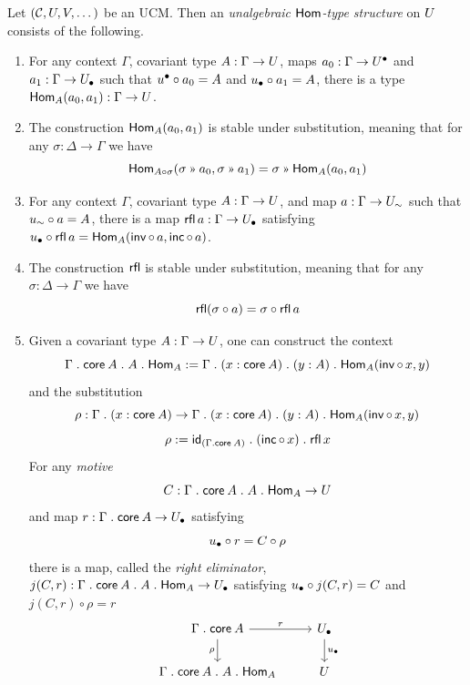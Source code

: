 \begin{definition} \label{def:elementary-hom-type}
  Let $(\CC,\U,\V,\dots)$ be an UCM.
  Then an \emph{unalgebraic $\Hom$-type structure}
  on $\U$ consists of the following.
  \begin{enumerate}
  \item
    For any context $\Gamma$, covariant type $A : \Gamma \to \U$,
    maps $a_0 : \Gamma \to \Uupp$ and
    $a_1 : \Gamma \to \Ulow$ such that
    $\uupp \circ a_0 = A$ and $\ulow \circ a_1 = A$,
    there is a type $\Hom_A (a_0,a_1) : \Gamma \to \U$.
  \item
    The construction $\Hom_A (a_0,a_1)$ is stable under substitution,
    meaning that for any $\sigma : \Delta \to \Gamma$ we have
    \[ \Hom_{A \circ \sigma} (\sigma \gg a_0, \sigma \gg a_1)
    = \sigma \gg \Hom_A (a_0,a_1) \]
  \item
    For any context $\Gamma$, covariant type $A : \Gamma \to \U$,
    and map $a : \Gamma \to \Usim$ such that
    $\usim \circ a = A$,
    there is a map $\rfl a : \Gamma \to \Ulow$
    satisfying
    $\ulow \circ \rfl a  = \Hom_A (\inv \circ \, a,\inc \circ \, a)$.
  \item The construction $\rfl$ is stable under substitution,
    meaning that for any $\sigma : \Delta \to \Gamma$ we have
    \[ \rfl (\sigma \circ a) = \sigma \circ \rfl a \]
  \item
    Given a covariant type $A : \Gamma \to \U$,
    one can construct the context 
    \[\Gamma \opext \vCore A \opext A \opext \Hom_A := \Gamma \opext (x : \vCore A) \opext (y : A) \opext \Hom_A(\inv \circ \, x,y)\]
    and the substitution
    \[\rho : \Gamma \opext (x : \vCore A) \to \Gamma \opext (x : \vCore A) \opext (y : A) \opext \Hom_A(\inv \circ \, x,y)\]
    \[\rho := \id_{(\Gamma \opext \vCore A)} \opext (\inc \circ \, x) \opext \rfl x\]
    For any \emph{motive} \[C : \Gamma \opext \vCore A \opext A \opext \Hom_A \to \U\]
    and map $r : \Gamma \opext \vCore A \to \Ulow$ satisfying
    \[ \ulow \circ r = C \circ \rho \]
    there is a map, called the \emph{right eliminator},
    $j (C, r) : \Gamma \opext \vCore A \opext A \opext \Hom_A \to \Ulow$
    satisfying $\ulow \circ j(C,r) = C$ and
    $j (C, r) \circ \rho  = r$
    \[\begin{tikzcd}
	   \Gamma \opext \vCore A & \Ulow \\
	   {\Gamma \opext \vCore A \opext A \opext \Hom_A} & \U
	   \arrow["{r}", from=1-1, to=1-2]
	   \arrow["{\rho}"', from=1-1, to=2-1]
	   \arrow["\ulow", from=1-2, to=2-2]

\end{tikzcd}\]
\end{enumerate}
\end{definition}
